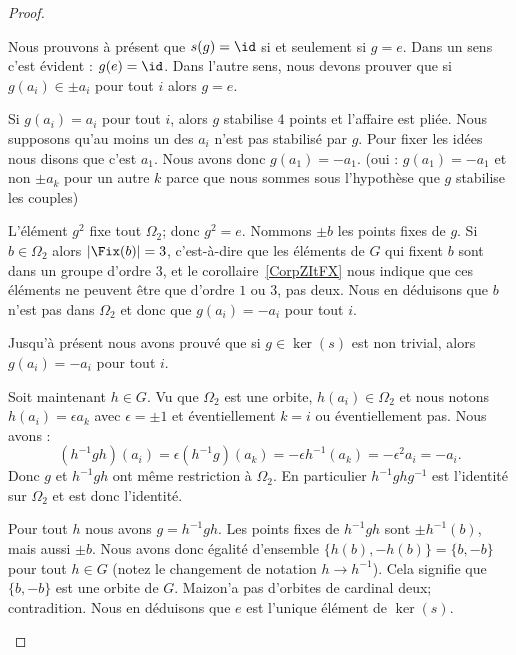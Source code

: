 \begin{proof}
\begin{subproof}
\begin{subproof}
                    Nous prouvons à présent que \( s(g)=\id\) si et seulement si \( g=e\). Dans un sens c'est évident : \( g(e)=\id\). Dans l'autre sens, nous devons prouver que si \( g(a_i)\in \pm a_i\) pour tout \( i\) alors \( g=e\).

                    Si \( g(a_i)=a_i\) pour tout \( i\), alors \( g\) stabilise \( 4\) points et l'affaire est pliée. Nous supposons qu'au moins un des \( a_i\) n'est pas stabilisé par \( g\). Pour fixer les idées nous disons que c'est \( a_1\). Nous avons donc \( g(a_1)=-a_1\). (oui : \( g(a_1)=-a_1\) et non \( \pm a_k\) pour un autre \( k\) parce que nous sommes sous l'hypothèse que \( g\) stabilise les couples)

                    L'élément \( g^2\) fixe tout \( \Omega_2\); donc \( g^2=e\). Nommons \( \pm b\) les points fixes de \( g\). Si \( b\in \Omega_2\) alors \( | \Fix(b) |=3\), c'est-à-dire que les éléments de \( G\) qui fixent \( b\) sont dans un groupe d'ordre \( 3\), et le corollaire~\ref{CorpZItFX} nous indique que ces éléments ne peuvent être que d'ordre \( 1\) ou \( 3\), pas deux. Nous en déduisons que \( b\) n'est pas dans \( \Omega_2\) et donc que \( g(a_i)=-a_i\) pour tout \( i\).

                    Jusqu'à présent nous avons prouvé que si \( g\in \ker(s)\) est non trivial,  alors \( g(a_i)=-a_i\) pour tout \( i\).

                    Soit maintenant \( h\in G\). Vu que \( \Omega_2\) est une orbite, \( h(a_i)\in \Omega_2\) et nous notons \( h(a_i)=\epsilon a_k\) avec \( \epsilon=\pm 1\) et éventiellement \( k=i\) ou éventiellement pas. Nous avons :
                    \begin{equation}
                        (h^{-1}gh)(a_i)=\epsilon (h^{-1} g)(a_k)=-\epsilon h^{-1}(a_k)=-\epsilon^2 a_i=-a_i.
                    \end{equation}
                    Donc \( g\) et \( h^{-1} g h\) ont même restriction à \( \Omega_2\). En particulier \( h^{-1} ghg^{-1}\) est l'identité sur \( \Omega_2\) et est donc l'identité.

                    Pour tout \( h\) nous avons \( g=h^{-1} gh\). Les points fixes de \( h^{-1}g h\) sont \( \pm h^{-1}(b)\), mais aussi \( \pm b\). Nous avons donc égalité d'ensemble \( \{ h(b),-h(b) \}=\{ b,-b \}\) pour tout \( h\in G\) (notez le changement de notation \( h\to h^{-1}\)). Cela signifie que \( \{ b,-b \}\) est une orbite de \( G\). Maizon'a pas d'orbites de cardinal deux; contradition. Nous en déduisons que \( e\) est l'unique élément de \( \ker(s)\).


\end{subproof}
\end{subproof}
\end{proof}
